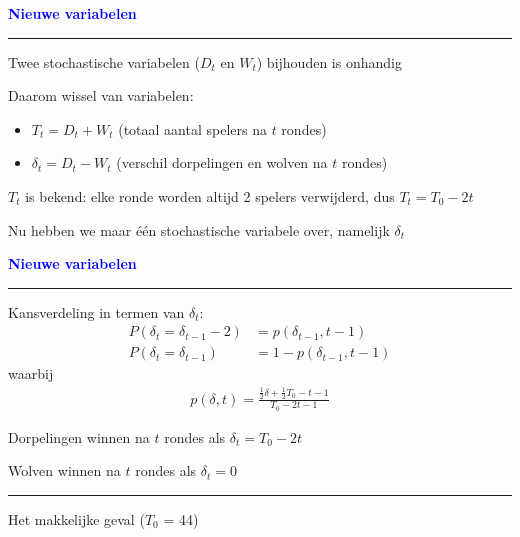 \documentclass{beamer}
\def\lbt{} %
\newenvironment{dia}[2]
{
	\begin{frame}
	\vspace{1mm}
	{\small #1}
	\hfill
    {\small\bf\textcolor{blue}{#2}}
	\vspace{3mm}
	\hrule
	\bigskip
}
{
	\vfill
	\end{frame}
}
\begin{document}
\begin{dia}{\lbt}{Nieuwe variabelen}
Twee stochastische variabelen ($D_t$ en $W_t$) bijhouden is onhandig \pause \bigskip

Daarom wissel van variabelen: \pause
\begin{itemize}
    \item $T_t = D_t + W_t$ (totaal aantal spelers na $t$ rondes)
    \item $\delta_t = D_t - W_t$ (verschil dorpelingen en wolven na $t$ rondes)
\end{itemize} \pause \bigskip

$T_t$ is bekend: elke ronde worden altijd 2 spelers verwijderd, dus $T_t = T_0 - 2t$ \pause \bigskip

Nu hebben we maar één stochastische variabele over, namelijk $\delta_t$
\end{dia}

\begin{dia}{\lbt}{Nieuwe variabelen}
Kansverdeling in termen van $\delta_t$:
\begin{align*}
    P(\delta_t = \delta_{t-1} - 2) &= p(\delta_{t - 1}, t - 1) \\[4mm]
    P(\delta_t = \delta_{t-1}) &= 1 - p(\delta_{t - 1}, t - 1)
\end{align*}
waarbij
\begin{align*}
    p(\delta, t) = \frac{\frac12\delta + \frac12T_0 - t - 1}{T_0 - 2t - 1}
\end{align*} \pause \smallskip

Dorpelingen winnen na $t$ rondes als $\delta_t = T_0 - 2t$ \pause \bigskip

Wolven winnen na $t$ rondes als $\delta_t = 0$
\vspace{-6mm}
\end{dia}

\begin{dia}{\lbt}{}
\vspace{2.5cm}
\begin{center}
\begin{LARGE}
\textcolor{mygreen}{Het makkelijke geval ($T_0$ = 44)}
\end{LARGE}
\end{center}
\vspace*{1.5cm}
\end{dia}
\end{document}
